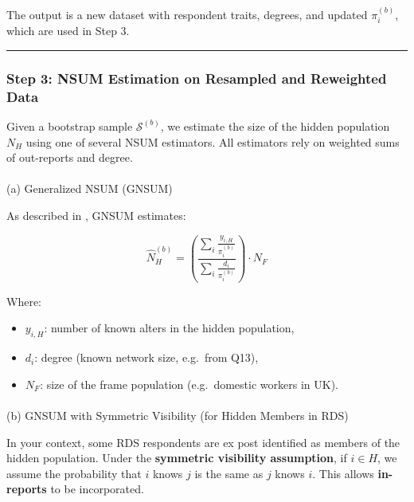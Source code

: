 \documentclass[
  12pt,
  letterpaper,
  DIV=11,
  numbers=noendperiod]{scrartcl}
\makeatletter
\let\oldparagraph\paragraph
\renewcommand{\paragraph}{
    \@ifstar
      \xxxParagraphStar
      \xxxParagraphNoStar
  }
\newcommand{\xxxParagraphStar}[1]{\oldparagraph*{#1}\mbox{}}
\newcommand{\xxxParagraphNoStar}[1]{\oldparagraph{#1}\mbox{}}
\theoremstyle{plain}
\theoremstyle{definition}
\makeatother
\begin{document}
The output is a new dataset with respondent traits, degrees, and updated
\(\pi_i^{(b)}\), which are used in Step 3.

\begin{center}\rule{0.5\linewidth}{0.5pt}\end{center}

\subsubsection{Step 3: NSUM Estimation on Resampled and Reweighted
Data}\label{step-3-nsum-estimation-on-resampled-and-reweighted-data}

Given a bootstrap sample \(\mathcal{S}^{(b)}\), we estimate the size of
the hidden population \(N_H\) using one of several NSUM estimators. All
estimators rely on weighted sums of out-reports and degree.

\paragraph{(a) Generalized NSUM (GNSUM)}\label{a-generalized-nsum-gnsum}

As described in \textcite{feeh16-generaling}, GNSUM estimates:

\[\hat{N}_H^{(b)} = \left( \frac{\sum_{i} \frac{y_{i,H}}{\pi_i^{(b)}}}{\sum_{i} \frac{d_i}{\pi_i^{(b)}}} \right) \cdot N_F\]

Where:

\begin{itemize}
\item
  \(y_{i,H}\): number of known alters in the hidden population,
\item
  \(d_i\): degree (known network size, e.g.~from Q13),
\item
  \(N_F\): size of the frame population (e.g.~domestic workers in UK).
\end{itemize}

\paragraph{(b) GNSUM with Symmetric Visibility (for Hidden Members in
RDS)}\label{b-gnsum-with-symmetric-visibility-for-hidden-members-in-rds}

In your context, some RDS respondents are ex post identified as members
of the hidden population. Under the \textbf{symmetric visibility
assumption}, if \(i \in H\), we assume the probability that \(i\) knows
\(j\) is the same as \(j\) knows \(i\). This allows \textbf{in-reports}
to be incorporated.
\end{document}
